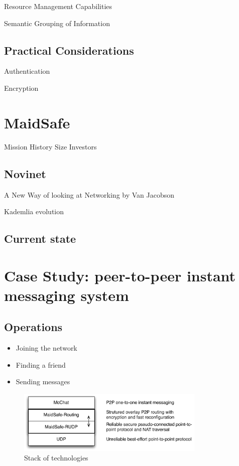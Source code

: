 Resource Management Capabilities

Semantic Grouping of Information


\subsection{Practical Considerations}

Authentication

Encryption


\section{MaidSafe}

Mission
History
Size
Investors

\subsection{Novinet}

A New Way of looking at Networking by Van Jacobson

Kademlia evolution

\subsection{Current state}




\section{Case Study: peer-to-peer instant messaging system}

\subsection{Operations}
\begin{itemize}
	\item Joining the network
	\item Finding a friend
	\item Sending messages
\end{itemize}

\begin{figure}[htb]
\begin{center}
\includegraphics[width=0.8\textwidth]{figures/stack}
\caption{\label{fig:Stack} Stack of technologies}
\end{center}
\end{figure}
